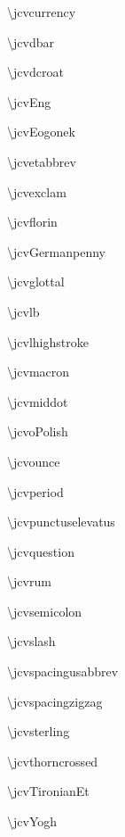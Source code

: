 \documentclass{article}
\begin{document}
\begin{multicols}{3}
\textbackslash jcvcurrency

\textbackslash jcvdbar

\textbackslash jcvdcroat

\textbackslash jcvEng

\textbackslash jcvEogonek

\textbackslash jcvetabbrev

\textbackslash jcvexclam

\textbackslash jcvflorin

\textbackslash jcvGermanpenny

\textbackslash jcvglottal

\textbackslash jcvlb

\textbackslash jcvlhighstroke %

\textbackslash jcvmacron

\textbackslash jcvmiddot

\textbackslash jcvoPolish

\textbackslash jcvounce

\textbackslash jcvperiod

\textbackslash jcvpunctuselevatus

\textbackslash jcvquestion

\textbackslash jcvrum

\textbackslash jcvsemicolon

\textbackslash jcvslash

\textbackslash jcvspacingusabbrev

\textbackslash jcvspacingzigzag

\textbackslash jcvsterling

\textbackslash jcvthorncrossed

\textbackslash jcvTironianEt

\textbackslash jcvYogh
\end{multicols}
\end{document}
